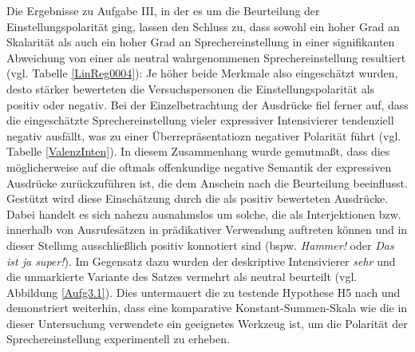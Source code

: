 Die Ergebnisse zu Aufgabe III, in der es um die Beurteilung der Einstellungspolarität ging, lassen den Schluss zu, dass sowohl ein hoher Grad an Skalarität als auch ein hoher Grad an Sprechereinstellung in einer signifikanten Abweichung von einer als neutral wahrgenommenen Sprechereinstellung resultiert (vgl. Tabelle \ref{LinReg0004}): Je höher beide Merkmale also eingeschätzt wurden, desto stärker bewerteten die Versuchspersonen die Einstellungspolarität als positiv oder negativ. Bei der Einzelbetrachtung der Ausdrücke fiel ferner auf, dass die eingeschätzte Sprechereinstellung vieler expressiver Intensivierer tendenziell negativ ausfällt, was zu einer Überrepräsentatiozn negativer Polarität führt (vgl. Tabelle \ref{ValenzInten}). In diesem Zusammenhang wurde gemutmaßt, dass dies möglicherweise auf die oftmals offenkundige negative Semantik der expressiven Ausdrücke zurückzuführen ist, die dem Anschein nach die Beurteilung beeinflusst. Gestützt wird diese Einschätzung durch die als positiv bewerteten Ausdrücke. Dabei handelt es sich nahezu ausnahmslos um solche, die als Interjektionen bzw. innerhalb von Ausrufesätzen in prädikativer Verwendung auftreten können und in dieser Stellung ausschließlich positiv konnotiert sind (bspw. \textit{Hammer!} oder \textit{Das ist ja super!}). Im Gegensatz dazu wurden der deskriptive Intensivierer \textit{sehr} und die unmarkierte Variante des Satzes vermehrt als neutral beurteilt (vgl. Abbildung \ref{Aufg3.1}). Dies untermauert die zu testende Hypothese H5 nach \citet[135]{Gutzmann.2019a} und demonstriert weiterhin, dass eine komparative Konstant-Summen-Skala wie die in dieser Untersuchung verwendete ein geeignetes Werkzeug ist, um die Polarität der Sprechereinstellung experimentell zu erheben.


